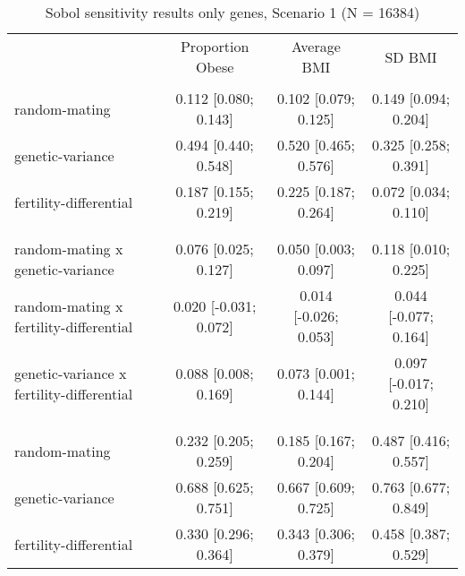 
\begin{table}[htp]
\renewcommand{\arraystretch}{1.3}
\setlength{\tabcolsep}{5pt}
\caption{Sobol sensitivity results only genes, Scenario 1 (N = 16384)}
\label{tab:sobol}
\footnotesize
\centering
\begin{threeparttable}
\begin{tabular}{lccc}
\hline
\addlinespace
& Proportion Obese & Average BMI & SD BMI \\
\addlinespace
\hline
\addlinespace[6pt]
\multicolumn{4}{l}{\hspace{1em} S1} \\
\hspace{1.5em} random-mating & 0.112 [0.080; 0.143]   & 0.102 [0.079; 0.125]   & 0.149 [0.094; 0.204] \\
	  \hspace{1.5em} genetic-variance & 0.494 [0.440; 0.548]   & 0.520 [0.465; 0.576]   & 0.325 [0.258; 0.391] \\
	  \hspace{1.5em} fertility-differential & 0.187 [0.155; 0.219]   & 0.225 [0.187; 0.264]   & 0.072 [0.034; 0.110] \\
	 \\
\addlinespace[12pt]
\multicolumn{4}{l}{\hspace{1em} S2} \\ 
\hspace{1.5em} random-mating x genetic-variance & 0.076 [0.025; 0.127]   & 0.050 [0.003; 0.097]   & 0.118 [0.010; 0.225] \\
	  \hspace{1.5em} random-mating x fertility-differential & 0.020 [-0.031; 0.072]   & 0.014 [-0.026; 0.053]   & 0.044 [-0.077; 0.164] \\
	  \hspace{1.5em} genetic-variance x fertility-differential & 0.088 [0.008; 0.169]   & 0.073 [0.001; 0.144]   & 0.097 [-0.017; 0.210] \\
	 \\
\addlinespace[12pt]
\multicolumn{4}{l}{\hspace{1em} ST} \\ 
\hspace{1.5em} random-mating & 0.232 [0.205; 0.259]   & 0.185 [0.167; 0.204]   & 0.487 [0.416; 0.557] \\
	  \hspace{1.5em} genetic-variance & 0.688 [0.625; 0.751]   & 0.667 [0.609; 0.725]   & 0.763 [0.677; 0.849] \\
	  \hspace{1.5em} fertility-differential & 0.330 [0.296; 0.364]   & 0.343 [0.306; 0.379]   & 0.458 [0.387; 0.529] \\

\end{tabular}
\end{threeparttable}
\end{table}
